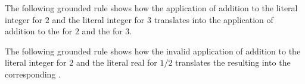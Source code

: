 \FormallyParagraph
\begin{mathpar}
\end{mathpar}

\begin{mathpar}
\end{mathpar}

\begin{mathpar}
\end{mathpar}


The following grounded rule shows how the application of addition
to the literal integer for $2$ and the literal integer for $3$
translates into the application of addition to the \nativevalueterm{} for $2$
and the \nativevalueterm{} for $3$.
\begin{mathpar}
\end{mathpar}

The following grounded rule shows how the invalid application of addition
to the literal integer for $2$ and the literal real for $1/2$
translates the resulting \typingerrorterm{} into the corresponding \dynamicerrorterm{}.
\begin{mathpar}
\end{mathpar}

